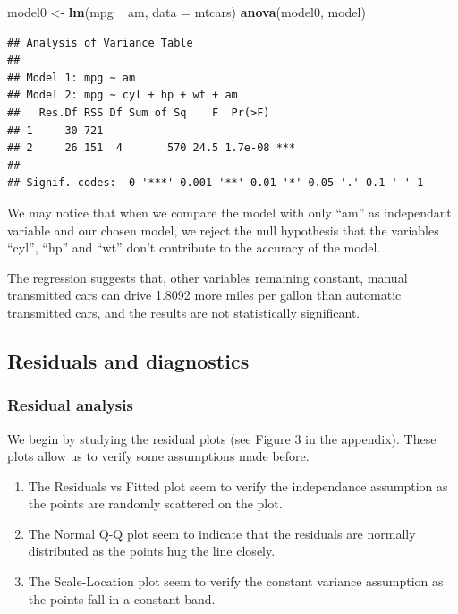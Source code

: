 \documentclass[a3paper]{article}
\newenvironment{Shaded}{\begin{snugshade}}{\end{snugshade}}
\newcommand{\KeywordTok}[1]{\textcolor[rgb]{0.13,0.29,0.53}{\textbf{{#1}}}}
\newcommand{\DataTypeTok}[1]{\textcolor[rgb]{0.13,0.29,0.53}{{#1}}}
\newcommand{\StringTok}[1]{\textcolor[rgb]{0.31,0.60,0.02}{{#1}}}
\newcommand{\NormalTok}[1]{{#1}}
\begin{document}
\begin{Shaded}
\begin{Highlighting}[]
\NormalTok{model0 <-}\StringTok{ }\KeywordTok{lm}\NormalTok{(mpg ~}\StringTok{ }\NormalTok{am, }\DataTypeTok{data =} \NormalTok{mtcars)}
\KeywordTok{anova}\NormalTok{(model0, model)}
\end{Highlighting}
\end{Shaded}

\begin{verbatim}
## Analysis of Variance Table
## 
## Model 1: mpg ~ am
## Model 2: mpg ~ cyl + hp + wt + am
##   Res.Df RSS Df Sum of Sq    F  Pr(>F)    
## 1     30 721                              
## 2     26 151  4       570 24.5 1.7e-08 ***
## ---
## Signif. codes:  0 '***' 0.001 '**' 0.01 '*' 0.05 '.' 0.1 ' ' 1
\end{verbatim}

We may notice that when we compare the model with only ``am'' as
independant variable and our chosen model, we reject the null hypothesis
that the variables ``cyl'', ``hp'' and ``wt'' don't contribute to the
accuracy of the model.

The regression suggests that, other variables remaining constant, manual
transmitted cars can drive 1.8092 more miles per gallon than automatic
transmitted cars, and the results are not statistically significant.

\subsection{Residuals and diagnostics}\label{residuals-and-diagnostics}

\subsubsection{Residual analysis}\label{residual-analysis}

We begin by studying the residual plots (see Figure 3 in the appendix).
These plots allow us to verify some assumptions made before.

\begin{enumerate}
\def\labelenumi{\arabic{enumi}.}
\setcounter{enumi}{2}
\itemsep1pt\parskip0pt
\item
  The Residuals vs Fitted plot seem to verify the independance
  assumption as the points are randomly scattered on the plot.
\item
  The Normal Q-Q plot seem to indicate that the residuals are normally
  distributed as the points hug the line closely.
\item
  The Scale-Location plot seem to verify the constant variance
  assumption as the points fall in a constant band.
\end{enumerate}
\end{document}
